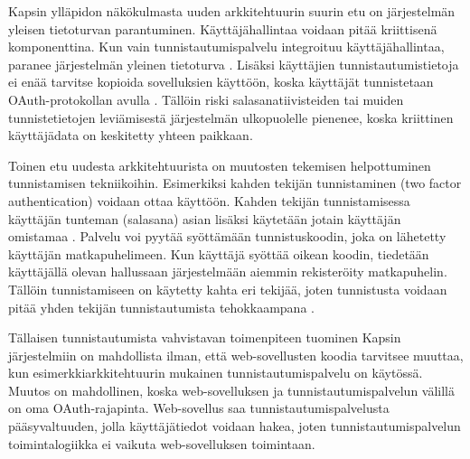 Kapsin ylläpidon näkökulmasta uuden arkkitehtuurin suurin etu on järjestelmän yleisen tietoturvan parantuminen. Käyttäjähallintaa voidaan pitää kriittisenä komponenttina. Kun vain tunnistautumispalvelu integroituu käyttäjähallintaa, paranee järjestelmän yleinen tietoturva \cite{arkkitehtuurit}. Lisäksi käyttäjien tunnistautumistietoja ei enää tarvitse kopioida sovelluksien käyttöön, koska käyttäjät tunnistetaan OAuth-protokollan avulla \cite{oauth2_0}. Tällöin riski salasanatiivisteiden tai muiden tunnistetietojen leviämisestä järjestelmän ulkopuolelle pienenee, koska kriittinen käyttäjädata on keskitetty yhteen paikkaan.

Toinen etu uudesta arkkitehtuurista on muutosten tekemisen helpottuminen tunnistamisen tekniikoihin. Esimerkiksi kahden tekijän tunnistaminen (two factor authentication) voidaan ottaa käyttöön. Kahden tekijän tunnistamisessa käyttäjän tunteman (salasana) asian lisäksi käytetään jotain käyttäjän omistamaa \cite{nisti}. Palvelu voi pyytää syöttämään tunnistuskoodin, joka on lähetetty käyttäjän matkapuhelimeen. Kun käyttäjä syöttää oikean koodin, tiedetään käyttäjällä olevan hallussaan järjestelmään aiemmin rekisteröity matkapuhelin. Tällöin tunnistamiseen on käytetty kahta eri tekijää, joten tunnistusta voidaan pitää yhden tekijän tunnistautumista tehokkaampana \cite{nisti}.

Tällaisen tunnistautumista vahvistavan toimenpiteen tuominen Kapsin järjestelmiin on mahdollista ilman, että web-sovellusten koodia tarvitsee muuttaa, kun esimerkkiarkkitehtuurin mukainen tunnistautumispalvelu on käytössä. Muutos on mahdollinen, koska web-sovelluksen ja tunnistautumispalvelun välillä on oma OAuth-rajapinta. Web-sovellus saa tunnistautumispalvelusta pääsyvaltuuden, jolla käyttäjätiedot voidaan hakea, joten tunnistautumispalvelun toimintalogiikka ei vaikuta web-sovelluksen toimintaan.